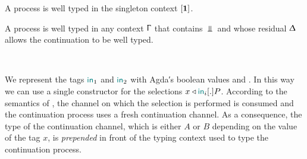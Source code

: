 \begin{AgdaAlign}
A  process is well typed in the singleton
context $[\mathbf{1}]$.

\begin{code}%
%
\>[3]%
\>[13]\AgdaSymbol{:}\AgdaSpace{}%
\AgdaSpace{}%
\AgdaSymbol{\}}\AgdaSpace{}%
\AgdaSymbol{(}\AgdaSpace{}%
\AgdaSymbol{:}\AgdaSpace{}%
\AgdaSpace{}%
\AgdaSpace{}%
\AgdaSpace{}%
\AgdaOperator{\AgdaFunction{,}}\AgdaSpace{}%
\AgdaSymbol{)}\AgdaSpace{}%
\AgdaSpace{}%
\AgdaSpace{}%
\AgdaSpace{}%
\AgdaSpace{}%
\AgdaSpace{}%
\<%
\end{code}

A  process is well typed in any context
$\Upgamma$ that contains $\Bot$ and whose residual $\Updelta$ allows the
continuation to be well typed.

\begin{code}%
%
\>[3]%
\>[13]\AgdaSymbol{:}%
\>[94I]\AgdaSpace{}%
\AgdaSpace{}%
\AgdaSpace{}%
\AgdaSymbol{\}}\AgdaSpace{}%
\AgdaSymbol{(}\AgdaSpace{}%
\AgdaSymbol{:}\AgdaSpace{}%
\AgdaSymbol{)}\AgdaSpace{}%
\AgdaSymbol{(}\AgdaSpace{}%
\AgdaSymbol{:}\AgdaSpace{}%
\AgdaSpace{}%
\AgdaSpace{}%
\AgdaSpace{}%
\AgdaSpace{}%
\AgdaSpace{}%
\AgdaOperator{\AgdaFunction{,}}\AgdaSpace{}%
\AgdaSymbol{)}\AgdaSpace{}%
\<%
\\
\>[.][@{}l@{}]\<[94I]%
\>[15]\AgdaSpace{}%
\AgdaSymbol{((}\AgdaSpace{}%
\AgdaSpace{}%
\AgdaSpace{}%
\AgdaSpace{}%
\AgdaSpace{}%
\AgdaSymbol{)}\AgdaSpace{}%
\AgdaSpace{}%
\AgdaSymbol{)}\AgdaSpace{}%
\AgdaSpace{}%
\AgdaSpace{}%
\<%
\end{code}

We represent the tags $\mathsf{\color{teal}in}_1$ and $\mathsf{\color{teal}in}_2$ with Agda′s boolean values
 and . In this
way we can use a single constructor  for the
selections $\Select\x{\InTag_i}.P$. According to the semantics of \Calculus, the
channel on which the selection is performed is consumed and the continuation
process uses a fresh continuation channel. As a consequence, the type of the
continuation channel, which is either $A$ or $B$ depending on the value of the
tag $x$, is \emph{prepended} in front of the typing context used to type the
continuation process.


\end{AgdaAlign}
